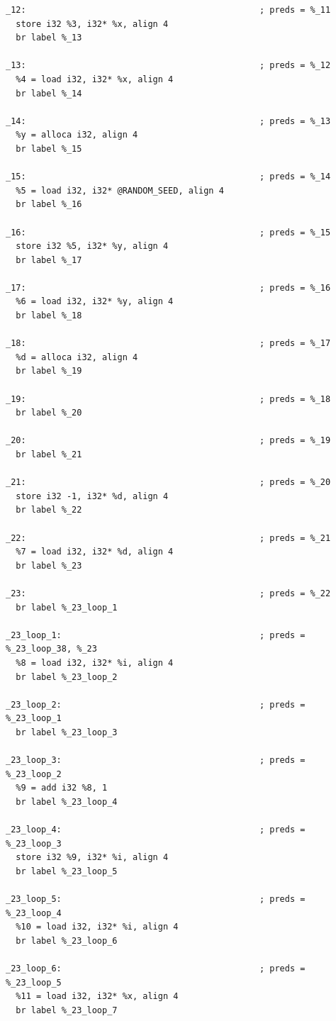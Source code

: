 \documentclass[12pt,a4paper]{article}
\begin{document}
\begin{verbatim}
_12:                                              ; preds = %_11
  store i32 %3, i32* %x, align 4
  br label %_13

_13:                                              ; preds = %_12
  %4 = load i32, i32* %x, align 4
  br label %_14

_14:                                              ; preds = %_13
  %y = alloca i32, align 4
  br label %_15

_15:                                              ; preds = %_14
  %5 = load i32, i32* @RANDOM_SEED, align 4
  br label %_16

_16:                                              ; preds = %_15
  store i32 %5, i32* %y, align 4
  br label %_17

_17:                                              ; preds = %_16
  %6 = load i32, i32* %y, align 4
  br label %_18

_18:                                              ; preds = %_17
  %d = alloca i32, align 4
  br label %_19

_19:                                              ; preds = %_18
  br label %_20

_20:                                              ; preds = %_19
  br label %_21

_21:                                              ; preds = %_20
  store i32 -1, i32* %d, align 4
  br label %_22

_22:                                              ; preds = %_21
  %7 = load i32, i32* %d, align 4
  br label %_23

_23:                                              ; preds = %_22
  br label %_23_loop_1

_23_loop_1:                                       ; preds = %_23_loop_38, %_23
  %8 = load i32, i32* %i, align 4
  br label %_23_loop_2

_23_loop_2:                                       ; preds = %_23_loop_1
  br label %_23_loop_3

_23_loop_3:                                       ; preds = %_23_loop_2
  %9 = add i32 %8, 1
  br label %_23_loop_4

_23_loop_4:                                       ; preds = %_23_loop_3
  store i32 %9, i32* %i, align 4
  br label %_23_loop_5

_23_loop_5:                                       ; preds = %_23_loop_4
  %10 = load i32, i32* %i, align 4
  br label %_23_loop_6

_23_loop_6:                                       ; preds = %_23_loop_5
  %11 = load i32, i32* %x, align 4
  br label %_23_loop_7


\end{verbatim}
\end{document}

